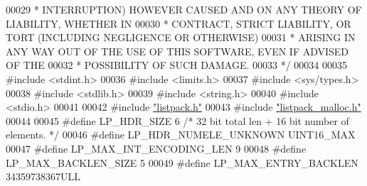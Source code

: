 \begin{DoxyCode}
00029 \textcolor{comment}{ * INTERRUPTION) HOWEVER CAUSED AND ON ANY THEORY OF LIABILITY, WHETHER IN}
00030 \textcolor{comment}{ * CONTRACT, STRICT LIABILITY, OR TORT (INCLUDING NEGLIGENCE OR OTHERWISE)}
00031 \textcolor{comment}{ * ARISING IN ANY WAY OUT OF THE USE OF THIS SOFTWARE, EVEN IF ADVISED OF THE}
00032 \textcolor{comment}{ * POSSIBILITY OF SUCH DAMAGE.}
00033 \textcolor{comment}{ */}
00034 
00035 \textcolor{preprocessor}{#}\textcolor{preprocessor}{include} \textcolor{preprocessor}{<}\textcolor{preprocessor}{stdint}\textcolor{preprocessor}{.}\textcolor{preprocessor}{h}\textcolor{preprocessor}{>}
00036 \textcolor{preprocessor}{#}\textcolor{preprocessor}{include} \textcolor{preprocessor}{<}\textcolor{preprocessor}{limits}\textcolor{preprocessor}{.}\textcolor{preprocessor}{h}\textcolor{preprocessor}{>}
00037 \textcolor{preprocessor}{#}\textcolor{preprocessor}{include} \textcolor{preprocessor}{<}\textcolor{preprocessor}{sys}\textcolor{preprocessor}{/}\textcolor{preprocessor}{types}\textcolor{preprocessor}{.}\textcolor{preprocessor}{h}\textcolor{preprocessor}{>}
00038 \textcolor{preprocessor}{#}\textcolor{preprocessor}{include} \textcolor{preprocessor}{<}\textcolor{preprocessor}{stdlib}\textcolor{preprocessor}{.}\textcolor{preprocessor}{h}\textcolor{preprocessor}{>}
00039 \textcolor{preprocessor}{#}\textcolor{preprocessor}{include} \textcolor{preprocessor}{<}\textcolor{preprocessor}{string}\textcolor{preprocessor}{.}\textcolor{preprocessor}{h}\textcolor{preprocessor}{>}
00040 \textcolor{preprocessor}{#}\textcolor{preprocessor}{include} \textcolor{preprocessor}{<}\textcolor{preprocessor}{stdio}\textcolor{preprocessor}{.}\textcolor{preprocessor}{h}\textcolor{preprocessor}{>}
00041 
00042 \textcolor{preprocessor}{#}\textcolor{preprocessor}{include} \hyperlink{listpack_8h}{"listpack.h"}
00043 \textcolor{preprocessor}{#}\textcolor{preprocessor}{include} \hyperlink{listpack__malloc_8h}{"listpack\_malloc.h"}
00044 
00045 \textcolor{preprocessor}{#}\textcolor{preprocessor}{define} \textcolor{preprocessor}{LP\_HDR\_SIZE} 6       \textcolor{comment}{/* 32 bit total len + 16 bit number of elements. */}
00046 \textcolor{preprocessor}{#}\textcolor{preprocessor}{define} \textcolor{preprocessor}{LP\_HDR\_NUMELE\_UNKNOWN} UINT16\_MAX
00047 \textcolor{preprocessor}{#}\textcolor{preprocessor}{define} \textcolor{preprocessor}{LP\_MAX\_INT\_ENCODING\_LEN} 9
00048 \textcolor{preprocessor}{#}\textcolor{preprocessor}{define} \textcolor{preprocessor}{LP\_MAX\_BACKLEN\_SIZE} 5
00049 \textcolor{preprocessor}{#}\textcolor{preprocessor}{define} \textcolor{preprocessor}{LP\_MAX\_ENTRY\_BACKLEN} 34359738367ULL

\end{DoxyCode}
